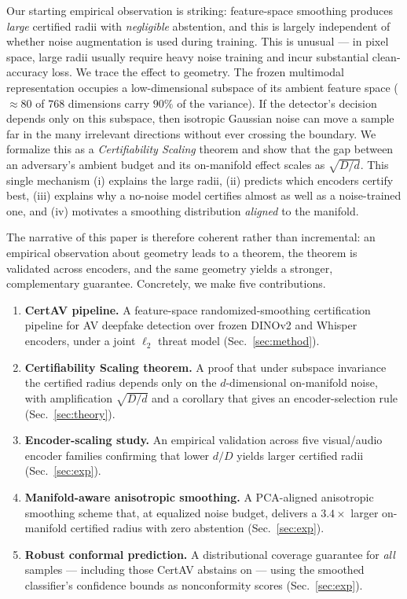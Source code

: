 Our starting empirical observation is striking: feature-space smoothing produces \emph{large} certified radii with \emph{negligible} abstention, and this is largely independent of whether noise augmentation is used during training. This is unusual --- in pixel space, large radii usually require heavy noise training and incur substantial clean-accuracy loss. We trace the effect to geometry. The frozen multimodal representation occupies a low-dimensional subspace of its ambient feature space ($\approx\!80$ of $768$ dimensions carry $90\%$ of the variance). If the detector's decision depends only on this subspace, then isotropic Gaussian noise can move a sample far in the many irrelevant directions without ever crossing the boundary. We formalize this as a \emph{Certifiability Scaling} theorem and show that the gap between an adversary's ambient budget and its on-manifold effect scales as $\sqrt{D/d}$. This single mechanism (i) explains the large radii, (ii) predicts which encoders certify best, (iii) explains why a no-noise model certifies almost as well as a noise-trained one, and (iv) motivates a smoothing distribution \emph{aligned} to the manifold.

The narrative of this paper is therefore coherent rather than incremental: an empirical observation about geometry leads to a theorem, the theorem is validated across encoders, and the same geometry yields a stronger, complementary guarantee. Concretely, we make five contributions.

\begin{enumerate}
\itemsep0.15em
\item \textbf{CertAV pipeline.} A feature-space randomized-smoothing certification pipeline for AV deepfake detection over frozen DINOv2 and Whisper encoders, under a joint $\ell_2$ threat model (Sec.~\ref{sec:method}).
\item \textbf{Certifiability Scaling theorem.} A proof that under subspace invariance the certified radius depends only on the $d$-dimensional on-manifold noise, with amplification $\sqrt{D/d}$ and a corollary that gives an encoder-selection rule (Sec.~\ref{sec:theory}).
\item \textbf{Encoder-scaling study.} An empirical validation across five visual/audio encoder families confirming that lower $d/D$ yields larger certified radii (Sec.~\ref{sec:exp}).
\item \textbf{Manifold-aware anisotropic smoothing.} A PCA-aligned anisotropic smoothing scheme that, at equalized noise budget, delivers a $3.4\times$ larger on-manifold certified radius with zero abstention (Sec.~\ref{sec:exp}).
\item \textbf{Robust conformal prediction.} A distributional coverage guarantee for \emph{all} samples --- including those CertAV abstains on --- using the smoothed classifier's confidence bounds as nonconformity scores (Sec.~\ref{sec:exp}).
\end{enumerate}
